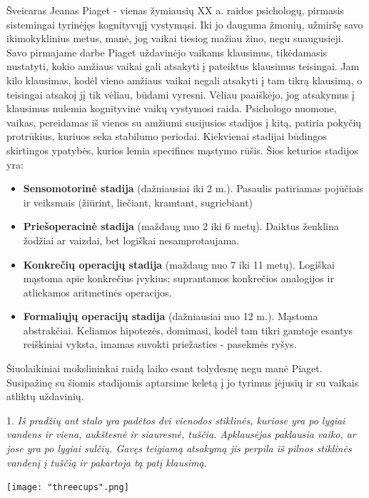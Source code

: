 \documentclass{article}
\begin{document}
Šveicaras Jeanas Piaget - vienas žymiausių XX a. raidos psichologų, pirmasis sistemingai tyrinėjęs kognityvųjį vystymąsi. Iki jo dauguma žmonių, užmiršę savo ikimokyklinius metus, manė, jog vaikai tiesiog mažiau žino, negu suaugusieji. Savo pirmajame darbe Piaget uždavinėjo vaikams klausimus, tikėdamasis nustatyti, kokio amžiaus vaikai gali atsakyti į pateiktus klausimus
teisingai. Jam kilo klausimas, kodėl vieno amžiaus vaikai negali atsakyti į tam tikrą klausimą, o teisingai atsakoį jį tik vėliau, būdami vyresni. Vėliau paaiškėjo, jog atsakymus į klausimus nulemia kognityvinė vaikų vystymosi raida. Psichologo nuomone, vaikas, pereidamas iš vienos su amžiumi susijusios stadijos į kitą, patiria pokyčių protrūkius, kuriuos seka stabilumo
periodai.  Kiekvienai stadijai būdingos skirtingos ypatybės, kurios lemia specifines mąstymo rūšis. Šios keturios stadijos yra:
\begin{itemize}
\item \textbf{Sensomotorinė stadija} (dažniausiai iki 2 m.). Pasaulis patiriamas pojūčiais ir veiksmais (žiūrint, liečiant, kramtant, sugriebiant)
\item \textbf{Priešoperacinė stadija} (maždaug nuo 2 iki 6 metų). Daiktus ženklina žodžiai ar vaizdai, bet logiškai nesamprotaujama.
\item \textbf{Konkrečių operacijų stadija} (maždaug nuo 7 iki 11 metų). Logiškai mąstoma apie konkrečius įvykius; suprantamos
konkrečios analogijos ir atliekamos aritmetinės operacijos.
\item \textbf{Formaliųjų operacijų stadija} (dažniausiai nuo 12 m.). Mąstoma abstrakčiai. Keliamos hipotezės, domimasi, kodėl tam tikri gamtoje esantys reiškiniai vyksta, imamas suvokti priežasties - pasekmės ryšys.

\end{itemize}
Šiuolaikiniai mokslininkai raidą laiko esant tolydesnę negu manė Piaget. Susipažinę su šiomis stadijomis aptarsime keletą į jo tyrimus įėjusių ir su vaikais atliktų uždavinių.

\begin{minipage}[b]{0.73\linewidth} 1. \textit{Iš pradžių ant stalo yra padėtos dvi vienodos stiklinės, kuriose yra po lygiai vandens ir viena, aukštesnė ir siauresnė, tuščia. Apklausėjas paklausia vaiko, ar jose yra po lygiai sulčių. Gavęs teigiamą atsakymą jis perpila iš pilnos stiklinės vandenį į tuščią ir pakartoja tą patį klausimą.} \end{minipage} \hspace{\fill} \begin{minipage}[b]{0.25\linewidth}\texttt{[image: "threecups".png]} \end{minipage}\newline
\end{document}
